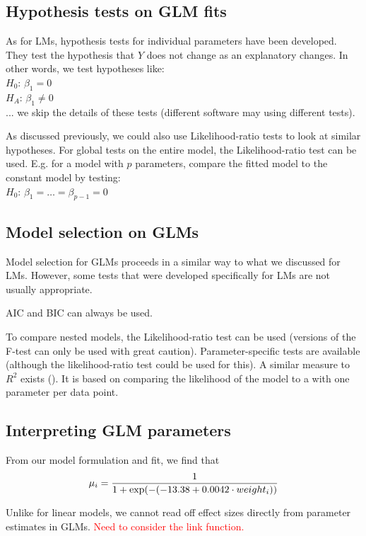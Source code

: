 \subsection{Hypothesis tests on GLM fits}

As for LMs, hypothesis tests for individual parameters have been developed. They test the hypothesis that $Y$ does not change as an explanatory changes. In other words, we test hypotheses like: \\
$H_0$: $\beta_1=0$ \\
$H_A$: $\beta_1\neq 0$ \\
... we skip the details of these tests (different software may using different tests).

As discussed previously, we could also use Likelihood-ratio tests to look at similar hypotheses. For global tests on the entire model, the Likelihood-ratio test can be used. E.g. for a model with $p$ parameters, compare the fitted model to the constant model by testing: \\
$H_0$: $\beta_1=\dots=\beta_{p-1}=0$

\subsection{Model selection on GLMs}

Model selection for GLMs proceeds in a similar way to what we discussed for LMs. However, some tests that were developed specifically for LMs are not usually appropriate.

AIC and BIC can always be used.

To compare nested models, the Likelihood-ratio test can be  used (versions of the F-test can only be used with great caution). Parameter-specific tests are available (although the likelihood-ratio test could be used for this). A similar measure to $R^2$ exists (). It is based on comparing the likelihood of the model to a  with one parameter per data point.

\subsection{Interpreting GLM parameters}

From our model formulation and fit, we find that
\begin{align}
	\mu_i = \frac{1}{1+\exp(-(-13.38+0.0042\cdot weight_i))} \notag
\end{align}

Unlike for linear models, we cannot read off effect sizes directly from parameter estimates in GLMs. \textcolor{red}{Need to consider the link function.}